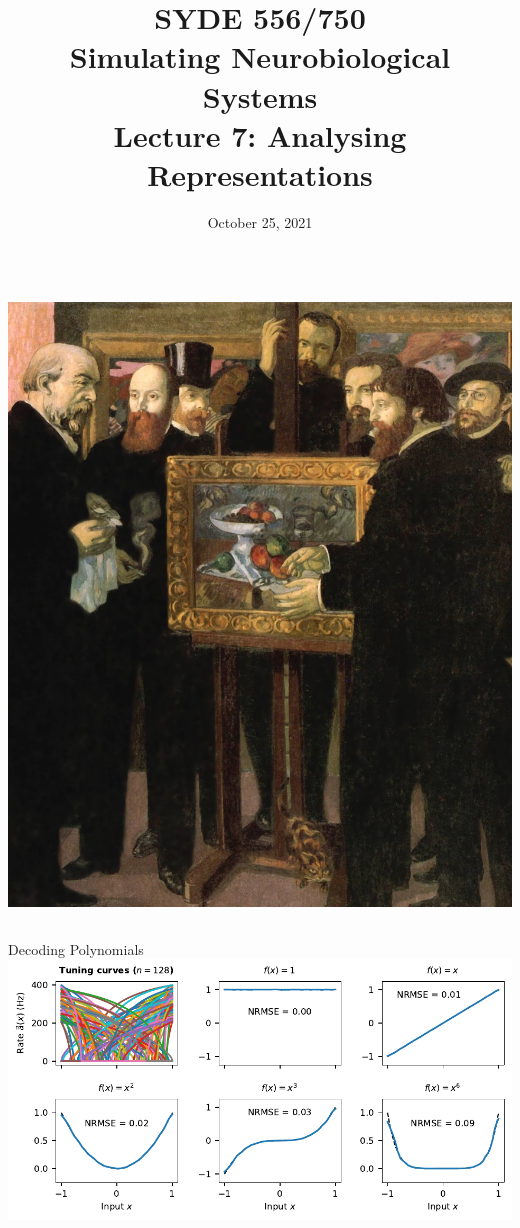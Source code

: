 \documentclass[handout,aspectratio=169]{beamer}
\date{October 25, 2021}
\title{SYDE 556/750 \\ Simulating Neurobiological Systems \\ Lecture 7: Analysing Representations}
\begin{document}
	
	\begin{frame}{}
		\vspace{0.5cm}
		\begin{columns}[c]
			\MakeTitle
			\includegraphics[width=\textwidth]{media/maurice_denis_homage_to_cezanne_1900_small.jpg}
		\end{columns}
	\end{frame}

	\begin{frame}{Decoding Polynomials}
		\centering
		\includegraphics[width=\textwidth]{media/poly_decodings.pdf} 
	\end{frame}
\end{document}
